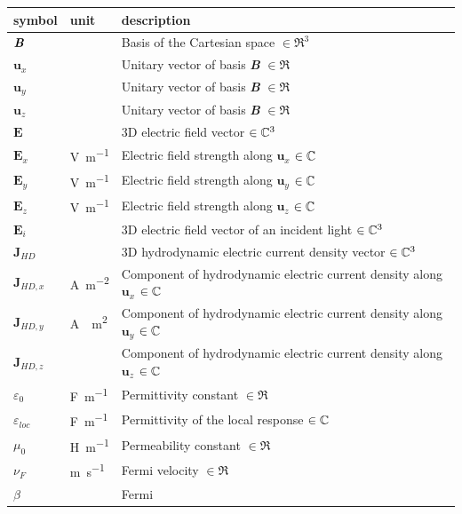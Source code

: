 \documentclass[12pt]{article}
\begin{document}
	\renewcommand{\arraystretch}{1.2} %
	\noindent \begin{longtable*}{l l p{12cm}} \toprule \textbf{symbol} &
		\textbf{unit} & \textbf{description}\\ \midrule $\textbf{\textit{B}}$ &   &
		Basis of the Cartesian space $\in \Re^3$ \\ $\textbf{u}_x$ & & Unitary vector
		of basis \textbf{\textit{B}} $\in \Re$ \\ $\textbf{u}_y$ & & Unitary vector
		of basis \textbf{\textit{B}} $\in \Re$ \\ $\textbf{u}_z$ & & Unitary vector
		of basis \textbf{\textit{B}} $\in \Re$ \\ $\textbf{E}$ &   & 3D electric
		field vector $\in \Bbb C^3$ \\ $\textbf{E}_x$ & \si{\volt \per \meter} &
		Electric field strength along $\textbf{u}_x$  $\in \Bbb C$ \\ $\textbf{E}_y$ &
		\si{\volt \per \meter} & Electric field strength along $\textbf{u}_y$ $\in \Bbb
		C$ \\ $\textbf{E}_z$ & \si{\volt \per \meter} & Electric field strength along
		$\textbf{u}_z$ $\in \Bbb C$ \\ $\textbf{E}_i$ &   & 3D electric field vector of
		an incident light $\in \Bbb C^3$ \\ $\textbf{J}_{HD}$ &  & 3D hydrodynamic
		electric current density vector $\in \Bbb C^3$ \\ $\textbf{J}_{HD,x}$ &
		\si{\ampere \per \square \meter} & Component of hydrodynamic electric current
		density along $\textbf{u}_x$ $\in \Bbb C$ \\ $\textbf{J}_{HD,y}$ & \si{\ampere
			\per \square \meter} & Component of hydrodynamic electric current density along
		$\textbf{u}_y$ $\in \Bbb C$ \\ $\textbf{J}_{HD,z}$ & \si{\ampere \per \square
			\meter} & Component of hydrodynamic electric current density along
		$\textbf{u}_z$ $\in \Bbb C$ \\ $\varepsilon_0$ & \si{\farad \per \meter} &
		Permittivity constant $\in \Re$ \\ $\varepsilon_{loc}$ & \si{\farad \per
			\meter} & Permittivity  of the local response $\in \Bbb C$ \\ $\mu_0$ &
		\si{\henry \per \meter} & Permeability constant $\in \Re$ \\ $\nu_F$ &
		\si{\meter \per \second} & Fermi velocity $\in \Re$ \\ $\beta$ &  &Fermi

\end{longtable*}
\end{document}
